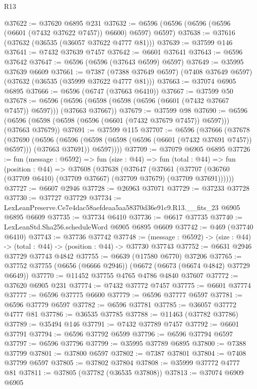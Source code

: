 \begin{lexlean}{R13}
\begin{coremodule}
@37622 := @37620 @6895 @231
@37632 := @6596 (@6596 (@6596 (@6596 (@6601 (@7432 @37622 @7457)) @6600) @6597) @6597)
@37638 := @37616 (@37632 (@36535 (@36057 @37622 @4777 @81)))
@37639 := @37599 @146
@37641 := @7432 @37639 @7457
@37642 := @6601 @37641
@37643 := @6596 @37642
@37647 := @6596 (@6596 (@37643 @6599) @6597)
@37649 := @35995 @37639 @6609
@37661 := @7387
    (@7388 @37649 @6597)
    (@7408 @37649 @6597)
    (@37632 (@36535 (@35999 @37622 @4777 @81)))
@37663 := @37074 @6905 @6895
@37666 := @6596 (@6747 (@37663 @6410))
@37667 := @37599 @50
@37678 := @6596 (@6596 (@6598 (@6598 (@6596 (@6601 (@7432 @37667 @7457)) @6597))) (@37663 @37667))
@37679 := @37599 @98
@37690 := @6596 (@6596 (@6598 (@6598 (@6596 (@6601 (@7432 @37679 @7457)) @6597))) (@37663 @37679))
@37691 := @37599 @115
@37707 := @6596
    (@37666
      (@37678
        (@37690
          (@6596
            (@6596 (@6598 (@6598 (@6596 (@6601 (@7432 @37691 @7457)) @6597))) (@37663 @37691))
            @6597))))
@37709 := @37079 @6905 @6895
@37726 := fun (message : @6592) =>
  fun (size : @44) =>
  fun (total : @44) =>
  fun (position : @44) =>
  @37608
    (@37638
      (@37647
        (@37661 (@37707 (@36760 (@37709 @6410) (@37709 @37667) (@37709 @37679) (@37709 @37691))))))
@37727 := @6607 @2946
@37728 := @26963 @37071
@37729 := @37233 @37728
@37730 := @37727 @37729
@37734 := LexLeanPreserve.Ce7e4dac58aefdeaa5aa58370d36e91c9.R13.__fits_23 @6905 @6895 @6609
@37735 := @37734 @6410
@37736 := @6617 @37735
@37740 := LexLeanStd.Sha256.scheduleWord @6905 @6895 @6609
@37742 := @469 (@37740 @6410)
@37743 := @37736 @37742
@37748 := (message : @6592) -> (size : @44) -> (total : @44) -> (position : @44) -> @37730 @37743
@37752 := @6631 @2946 @37729 @37743 @4842
@37755 := @6639 (@17580 @6770) @37206
@37765 := @37752 @37755 (@6656 (@6666 @2946)) (@6672 (@6673 (@6674 @4842) @37729 @6649))
@37770 := @11452 @37755 @4765 @4786 @4840 @37607
@37772 := @37620 @6905 @231
@37774 := @7432 @37772 @7457
@37775 := @6601 @37774
@37777 := @6596 @37775 @6600
@37779 := @6596 @37777 @6597
@37781 := @6596 @37779 @6597
@37782 := @6596 @37781
@37785 := @36057 @37772 @4777 @81
@37786 := @36535 @37785
@37788 := @11463 (@37782 @37786)
@37789 := @35494 @146
@37791 := @7432 @37789 @7457
@37792 := @6601 @37791
@37794 := @6596 @37792 @6599
@37796 := @6596 @37794 @6597
@37797 := @6596 @37796
@37799 := @35995 @37789 @6895
@37800 := @7388 @37799
@37801 := @37800 @6597
@37802 := @7387 @37801
@37804 := @7408 @37799 @6597
@37805 := @37802 @37804
@37808 := @35999 @37772 @4777 @81
@37811 := @37805 (@37782 (@36535 @37808))
@37813 := @37074 @6909 @6905

\end{coremodule}
\end{lexlean}
